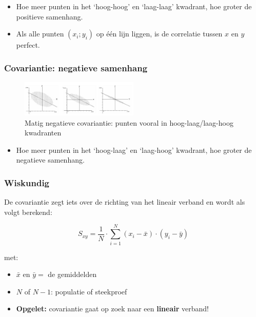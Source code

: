 \documentclass{article}
\begin{document}
\begin{itemize}
    \item Hoe meer punten in het `hoog-hoog' en `laag-laag' kwadrant, hoe groter de positieve samenhang.
    \item Als alle punten $(x_i; y_i)$ op één lijn liggen, is de correlatie tussen $x$ en $y$ perfect.
\end{itemize}

\subsubsection{Covariantie: negatieve samenhang}


\begin{figure}[H]
    \centering
    \includegraphics[width=0.5\textwidth]{covariantie-negatieve-samenhang.png}
    \caption{Matig negatieve covariantie: punten vooral in hoog-laag/laag-hoog kwadranten}
\end{figure}

\begin{itemize}
    \item Hoe meer punten in het `hoog-laag' en `laag-hoog' kwadrant, hoe groter de negatieve samenhang.
\end{itemize}

\subsubsection{Wiskundig}

De covariantie zegt iets over de richting van het lineair verband en wordt als volgt berekend:

\begin{equation}
S_{xy} = \frac{1}{N} \cdot \sum_{i=1}^N (x_i - \bar{x}) \cdot (y_i - \bar{y})
\end{equation}

met:

\begin{itemize}
    \item $\bar{x}$ en $\bar{y} =$ de gemiddelden
    \item $N$ of $N-1$: populatie of steekproef
    \item \textbf{Opgelet:} covariantie gaat op zoek naar een \textbf{lineair} verband!
\end{itemize}
\end{document}
